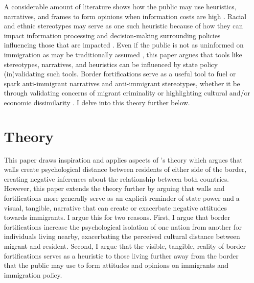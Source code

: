 \documentclass[12pt,]{article}
\begin{document}
A considerable amount of literature shows how the public may use
heuristics, narratives, and frames to form opinions when information
costs are high
\citep{mondak1993, rugeley2012, petersen2009, aaroe2014, culpepper2024}.
Racial and ethnic stereotypes may serve as one such heuristic because of
how they can impact information processing and decision-making
surrounding policies influencing those that are impacted
\citep{burns2000}. Even if the public is not as uninformed on
immigration as may be traditionally assumed \citep{lahav2004}, this
paper argues that tools like stereotypes, narratives, and heuristics can
be influenced by state policy (in)validating such tools. Border
fortifications serve as a useful tool to fuel or spark anti-immigrant
narratives and anti-immigrant stereotypes, whether it be through
validating concerns of migrant criminality or highlighting cultural
and/or economic dissimilarity
\citep{jaramillo-dent2021, mutz2022, carter2017}. I delve into this
theory further below.

\section{Theory}\label{theory}

This paper draws inspiration and applies aspects of \citet{mutz2022}'s
theory which argues that walls create psychological distance between
residents of either side of the border, creating negative inferences
about the relationship between both countries. However, this paper
extends the theory further by arguing that walls and fortifications more
generally serve as an explicit reminder of state power and a visual,
tangible, narrative that can create or exacerbate negative attitudes
towards immigrants. I argue this for two reasons. First, I argue that
border fortifications increase the psychological isolation of one nation
from another for individuals living nearby, exacerbating the perceived
cultural distance between migrant and resident. Second, I argue that the
visible, tangible, reality of border fortifications serves as a
heuristic to those living further away from the border that the public
may use to form attitudes and opinions on immigrants and immigration
policy.
\end{document}

